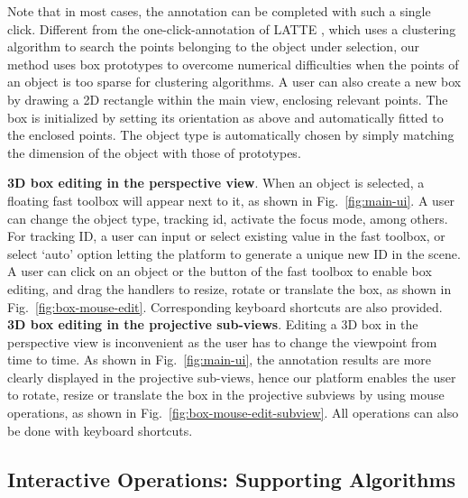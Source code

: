 \documentclass[letterpaper, 10 pt, conference]{ieeeconf}  %
\begin{document}
Note that in most cases, the annotation can be completed with such a single click. Different from the one-click-annotation of LATTE \cite{Wang2019LATTEAL}, which uses a clustering algorithm to search the points belonging to the object under selection, our method uses box prototypes to overcome numerical difficulties when the points of an object is too sparse for clustering algorithms. A user can also create a new box by drawing a 2D rectangle within the main view, enclosing relevant points. The box is initialized by setting its orientation as above and automatically fitted to the enclosed points. The object type is automatically chosen by simply matching the dimension of the object with those of prototypes.

\textbf{3D box editing in the perspective view}. When an object is selected, a floating fast toolbox will appear next to it, as shown in Fig.~\ref{fig:main-ui}. A user can change the object type, tracking id, activate the focus mode, among others. For tracking ID, a user can input or select existing value in the fast toolbox, or select `auto' option letting the platform to generate a unique new ID  in the scene. A user can click on an object or the button of the fast toolbox to enable box editing, and drag the handlers to resize, rotate or translate the box, as shown in Fig.~\ref{fig:box-mouse-edit}. Corresponding keyboard shortcuts are also provided.
\textbf{3D box editing in the projective sub-views}. Editing a 3D box in the perspective view is inconvenient as the user has to change the viewpoint from time to time. As shown in Fig.~\ref{fig:main-ui}, the annotation results are more clearly displayed in the projective sub-views,  hence our platform enables the user to rotate, resize or translate the box in the projective subviews by using mouse operations, as shown in Fig.~\ref{fig:box-mouse-edit-subview}. All operations can also be done with keyboard shortcuts.



\subsection{Interactive Operations: Supporting Algorithms}
\label{sec:support-algorithms}
\end{document}
